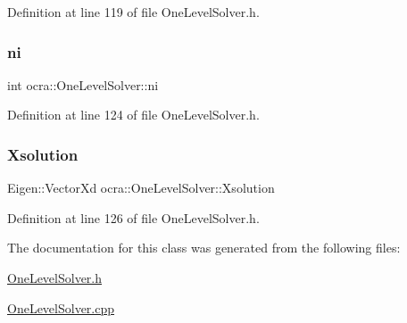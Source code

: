 Definition at line 119 of file One\+Level\+Solver.\+h.

\hypertarget{classocra_1_1OneLevelSolver_a8746c04321945142300adc9883992fa7}{}\label{classocra_1_1OneLevelSolver_a8746c04321945142300adc9883992fa7} 
\subsubsection{\texorpdfstring{ni}{ni}}
{\footnotesize\ttfamily int ocra\+::\+One\+Level\+Solver\+::ni\hspace{0.3cm}{\ttfamily [protected]}}



Definition at line 124 of file One\+Level\+Solver.\+h.

\hypertarget{classocra_1_1OneLevelSolver_a6292cf12a5c6ae5a498a0962272a4b40}{}\label{classocra_1_1OneLevelSolver_a6292cf12a5c6ae5a498a0962272a4b40} 
\subsubsection{\texorpdfstring{Xsolution}{Xsolution}}
{\footnotesize\ttfamily Eigen\+::\+Vector\+Xd ocra\+::\+One\+Level\+Solver\+::\+Xsolution\hspace{0.3cm}{\ttfamily [protected]}}



Definition at line 126 of file One\+Level\+Solver.\+h.



The documentation for this class was generated from the following files\+:\begin{DoxyCompactItemize}
\item 
\hyperlink{OneLevelSolver_8h}{One\+Level\+Solver.\+h}\item 
\hyperlink{OneLevelSolver_8cpp}{One\+Level\+Solver.\+cpp}\end{DoxyCompactItemize}
